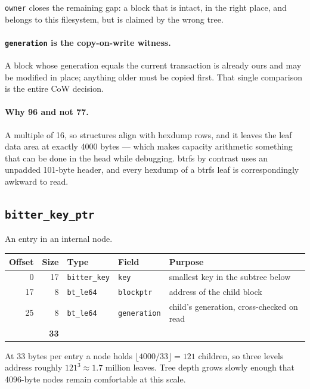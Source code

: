 \texttt{owner} closes the remaining gap: a block that is intact, in the right
place, and belongs to this filesystem, but is claimed by the wrong tree.

\paragraph{\texttt{generation} is the copy-on-write witness.} A block whose
generation equals the current transaction is already ours and may be modified
in place; anything older must be copied first. That single comparison is the
entire CoW decision.

\paragraph{Why 96 and not 77.} A multiple of 16, so structures align with
hexdump rows, and it leaves the leaf data area at exactly 4000 bytes --- which
makes capacity arithmetic something that can be done in the head while
debugging. btrfs by contrast uses an unpadded 101-byte header, and every
hexdump of a btrfs leaf is correspondingly awkward to read.

\subsection{\texttt{bitter\_key\_ptr}}

An entry in an internal node.

\begin{center}
\begin{tabular}{rrllp{6cm}}
  \toprule
  Offset & Size & Type & Field & Purpose \\
  \midrule
  0  & 17 & \texttt{bitter\_key} & \texttt{key}        & smallest key in the subtree below \\
  17 & 8  & \texttt{bt\_le64}    & \texttt{blockptr}   & address of the child block \\
  25 & 8  & \texttt{bt\_le64}    & \texttt{generation} & child's generation, cross-checked on read \\
  \midrule
  \multicolumn{2}{r}{\textbf{33}} & & & \\
  \bottomrule
\end{tabular}
\end{center}

At 33 bytes per entry a node holds $\lfloor 4000/33 \rfloor = 121$ children, so
three levels address roughly $121^3 \approx 1.7$ million leaves. Tree depth
grows slowly enough that 4096-byte nodes remain comfortable at this scale.

